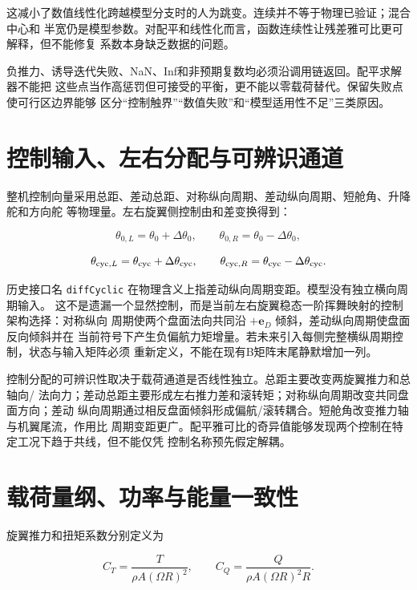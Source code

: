 \documentclass[UTF8,12pt,oneside,openany,fontset=windows]{ctexbook}
\begin{document}
这减小了数值线性化跨越模型分支时的人为跳变。连续并不等于物理已验证；混合中心和 半宽仍是模型参数。对配平和线性化而言，函数连续性让残差雅可比更可解释，但不能修复 系数本身缺乏数据的问题。

负推力、诱导迭代失败、NaN、Inf和非预期复数均必须沿调用链返回。配平求解器不能把 这些点当作高惩罚但可接受的平衡，更不能以零载荷替代。保留失败点使可行区边界能够 区分“控制触界”“数值失败”和“模型适用性不足”三类原因。

\section{控制输入、左右分配与可辨识通道}

整机控制向量采用总距、差动总距、对称纵向周期、差动纵向周期、短舱角、升降舵和方向舵 等物理量。左右旋翼侧控制由和差变换得到：

\begin{equation}
\theta_{0,L}=\theta_0+\Delta\theta_0,\qquad
\theta_{0,R}=\theta_0-\Delta\theta_0,
\end{equation}

\begin{equation}
\theta_{{\rm cyc},L}=\theta_{\rm cyc}+\Delta\theta_{\rm cyc},\qquad
\theta_{{\rm cyc},R}=\theta_{\rm cyc}-\Delta\theta_{\rm cyc}.
\end{equation}

历史接口名 \texttt{diffCyclic} 在物理含义上指差动纵向周期变距。模型没有独立横向周期输入。 这不是遗漏一个显然控制，而是当前左右旋翼稳态一阶挥舞映射的控制架构选择：对称纵向 周期使两个盘面法向共同沿 \(+\mathbf e_D\) 倾斜，差动纵向周期使盘面反向倾斜并在 当前符号下产生负偏航力矩增量。若未来引入每侧完整横纵周期控制，状态与输入矩阵必须 重新定义，不能在现有B矩阵末尾静默增加一列。

控制分配的可辨识性取决于载荷通道是否线性独立。总距主要改变两旋翼推力和总轴向/ 法向力；差动总距主要形成左右推力差和滚转矩；对称纵向周期改变共同盘面方向；差动 纵向周期通过相反盘面倾斜形成偏航/滚转耦合。短舱角改变推力轴与机翼尾流，作用比 周期变距更广。配平雅可比的奇异值能够发现两个控制在特定工况下趋于共线，但不能仅凭 控制名称预先假定解耦。

\section{载荷量纲、功率与能量一致性}

旋翼推力和扭矩系数分别定义为

\begin{equation}
C_T=\frac{T}{\rho A(\Omega R)^2},\qquad
C_Q=\frac{Q}{\rho A(\Omega R)^2R}.
\end{equation}
\end{document}
